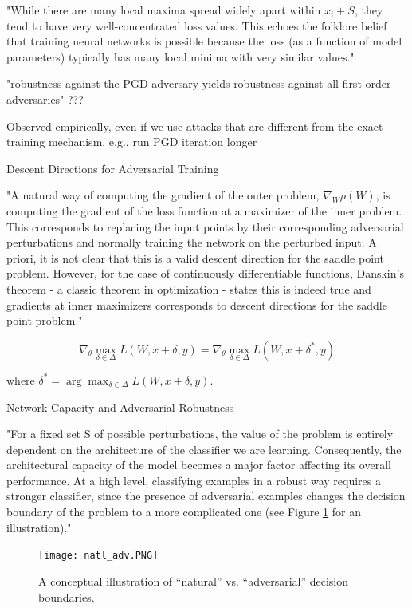 \documentclass[english]{article}
\begin{document}
\item "While there are many local maxima spread widely apart within
$x_i + S$, they tend to have very well-concentrated loss values. This echoes the folklore belief that
training neural networks is possible because the loss (as a function of model parameters) typically
has many local minima with very similar values."

\item "robustness against the PGD adversary yields
robustness against all first-order adversaries" ???

Observed empirically, even if we use attacks that are different from the exact training mechanism. e.g., run PGD iteration longer 

\item Descent Directions for Adversarial Training

"A natural way of computing the gradient of the outer problem,
$\nabla_W \rho(W)$, is computing the gradient of the loss function at a maximizer of the inner problem. This
corresponds to replacing the input points by their corresponding adversarial perturbations and
normally training the network on the perturbed input. A priori, it is not clear that this is a valid
descent direction for the saddle point problem. However, for the case of continuously differentiable
functions, Danskin's theorem - a classic theorem in optimization - states this is indeed true and
gradients at inner maximizers corresponds to descent directions for the saddle point problem."


$$\nabla_\theta \max_{\delta\in \Delta}
L(W,x+\delta,y)
= 
\nabla_\theta \max_{\delta\in \Delta}
L(W,x+\delta^*,y)
$$

where $\delta^* = \arg\max_{\delta\in \Delta}
L(W,x+\delta,y)$.

\item Network Capacity and Adversarial Robustness

"For a fixed set S of possible perturbations, the value of the problem is entirely dependent on the
architecture of the classifier we are learning. Consequently, the architectural capacity of the model
becomes a major factor affecting its overall performance. At a high level, classifying examples in
a robust way requires a stronger classifier, since the presence of adversarial examples changes the
decision boundary of the problem to a more complicated one (see Figure \ref{natl_adv} for an illustration)."

  \begin{figure}
        \centering
        \texttt{[image: natl\_adv.PNG]}
        
        \caption{A conceptual illustration of “natural” vs. “adversarial” decision boundaries.}
        \label{natl_adv}
    \end{figure}
\end{document}

